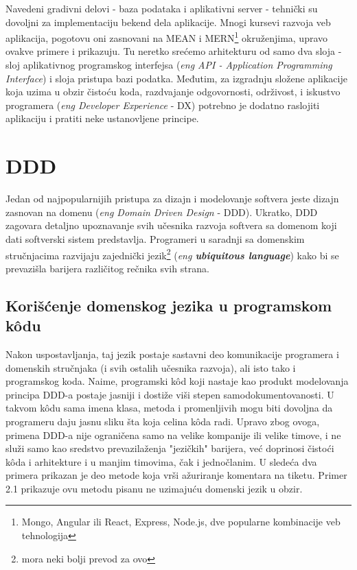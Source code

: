 \documentclass[12pt,oneside]{memoir}
\begin{document}
Navedeni gradivni delovi - baza podataka i aplikativni server - tehnički su dovoljni za implementaciju bekend dela aplikacije. Mnogi kursevi razvoja veb aplikacija, pogotovu oni zasnovani na MEAN i MERN\footnote{Mongo, Angular ili React, Express, Node.js, dve popularne kombinacije veb tehnologija} okruženjima, upravo ovakve primere i prikazuju. Tu neretko srećemo arhitekturu od samo dva sloja - sloj aplikativnog programskog interfejsa (\textit{eng API - Application Programming Interface}) i sloja pristupa bazi podatka. Međutim, za izgradnju složene aplikacije koja uzima u obzir čistoću koda, razdvajanje odgovornosti, održivost, i iskustvo programera (\textit{eng Developer Experience} - DX) potrebno je dodatno raslojiti aplikaciju i pratiti neke ustanovljene principe.


\section{DDD}
Jedan od najpopularnijih pristupa za dizajn i modelovanje softvera jeste dizajn zasnovan na domenu (\textit{eng Domain Driven Design} - DDD). Ukratko, DDD zagovara detaljno upoznavanje svih učesnika razvoja softvera sa domenom koji dati softverski sistem predstavlja. Programeri u saradnji sa domenskim stručnjacima razvijaju zajednički jezik\footnote{mora neki bolji prevod za ovo} (\textit{eng \textbf{ubiquitous language}}) kako bi se prevazišla barijera različitog rečnika svih strana. \cite{dddq}

\subsection{Korišćenje domenskog jezika u programskom k\^{o}du}
Nakon uspostavljanja, taj jezik postaje sastavni deo komunikacije programera i domenskih stručnjaka (i svih ostalih učesnika razvoja), ali isto tako i programskog koda. Naime, programski k\^{o}d koji nastaje kao produkt modelovanja principa DDD-a postaje jasniji i dostiže viši stepen samodokumentovanosti. U takvom k\^{o}du sama imena klasa, metoda i promenljivih mogu biti dovoljna da programeru daju jasnu sliku šta koja celina k\^{o}da radi. Upravo zbog ovoga, primena DDD-a nije ograničena samo na velike kompanije ili velike timove, i ne služi samo kao sredstvo prevazilaženja "jezičkih" barijera, već doprinosi čistoći k\^{o}da i arhitekture i u manjim timovima, čak i jednočlanim. U sledeća dva primera prikazan je deo metode koja vrši ažuriranje komentara na tiketu. Primer 2.1 prikazuje ovu metodu pisanu ne uzimajuću domenski jezik u obzir.
\end{document}

